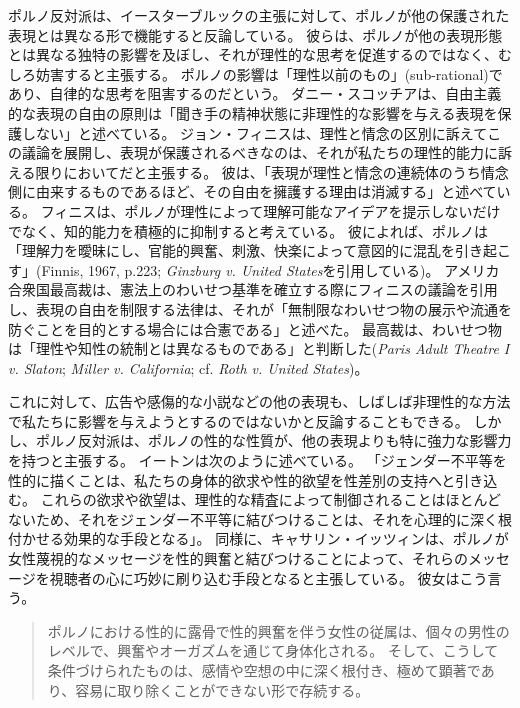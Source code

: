 \documentclass[paper=a4,book,openany]{jlreq} \usepackage{mystyle}
\begin{document}
ポルノ反対派は、イースターブルックの主張に対して、ポルノが他の保護された表現とは異なる形で機能すると反論している。
彼らは、ポルノが他の表現形態とは異なる独特の影響を及ぼし、それが理性的な思考を促進するのではなく、むしろ妨害すると主張する。
ポルノの影響は「理性以前のもの」(sub-rational)であり、自律的な思考を阻害するのだという。
ダニー・スコッチアは、自由主義的な表現の自由の原則は「聞き手の精神状態に非理性的な影響を与える表現を保護しない」と述べている\citep[p.777]{scoccia96:_can_liber_suppor_ban_violen_pornog}。
ジョン・フィニスは、理性と情念の区別に訴えてこの議論を展開し、表現が保護されるべきなのは、それが私たちの理性的能力に訴える限りにおいてだと主張する。
彼は、「表現が理性と情念の連続体のうち情念側に由来するものであるほど、その自由を擁護する理由は消滅する」と述べている\citep[p.222]{finnis67:_reason_passion}。
フィニスは、ポルノが理性によって理解可能なアイデアを提示しないだけでなく、知的能力を積極的に抑制すると考えている。
彼によれば、ポルノは「理解力を曖昧にし、官能的興奮、刺激、快楽によって意図的に混乱を引き起こす」(Finnis, 1967, p.223; \emph{Ginzburg v. United States}を引用している)。
\nocite{finnis67:_reason_passion}
アメリカ合衆国最高裁は、憲法上のわいせつ基準を確立する際にフィニスの議論を引用し、表現の自由を制限する法律は、それが「無制限なわいせつ物の展示や流通を防ぐことを目的とする場合には合憲である」と述べた。
最高裁は、わいせつ物は「理性や知性の統制とは異なるものである」と判断した(\emph{Paris Adult Theatre I v. Slaton}; \emph{Miller v. California}; cf. \emph{Roth v. United States})。

これに対して、広告や感傷的な小説などの他の表現も、しばしば非理性的な方法で私たちに影響を与えようとするのではないかと反論することもできる。
しかし、ポルノ反対派は、ポルノの性的な性質が、他の表現よりも特に強力な影響力を持つと主張する。
イートンは次のように述べている。
「ジェンダー不平等を性的に描くことは、私たちの身体的欲求や性的欲望を性差別の支持へと引き込む。
これらの欲求や欲望は、理性的な精査によって制御されることはほとんどないため、それをジェンダー不平等に結びつけることは、それを心理的に深く根付かせる効果的な手段となる」\citep[p.679]{eaton07:sensibleantiporn}。
同様に、キャサリン・イッツィンは、ポルノが女性蔑視的なメッセージを性的興奮と結びつけることによって、それらのメッセージを視聴者の心に巧妙に刷り込む手段となると主張している。
彼女はこう言う。

\begin{quote}
  ポルノにおける性的に露骨で性的興奮を伴う女性の従属は、個々の男性のレベルで、興奮やオーガズムを通じて身体化される。
そして、こうして条件づけられたものは、感情や空想の中に深く根付き、極めて顕著であり、容易に取り除くことができない形で存続する。
\citep[p.23]{itzin02:_pornog_const_misog}
\end{quote}
\end{document}
